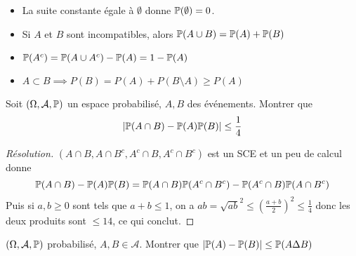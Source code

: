\begin{rem}
    \begin{itemize}
        \item La suite constante égale à $\emptyset$ donne $\P(\emptyset)=0$.
        \item Si $A$ et $B$ sont incompatibles, alors $\P(A\cup B)=\P(A)+\P(B)$ 
        \item $\P(A^c)=\P(A\cup A^c)-\P(A)=1-\P(A)$
        \item $A\subset B \implies P(B)=P(A)+P(B\setminus A)\geq P(A)$
    \end{itemize}
\end{rem}

\begin{exo}
    Soit $(\Omega, \mathcal A, \P)$ un espace probabilisé, $A, B$ des événements. Montrer que \[
        |\P(A\cap B)-\P(A)\P(B)|\leq \frac{1}{4}
    \]
\end{exo}

\begin{proof}[Résolution]
    $(A\cap B, A\cap B^c, A^c\cap B, A^c\cap B^c)$ est un SCE et un peu de calcul donne \[
        \P(A\cap B)-\P(A)\P(B)=\P(A\cap B)\P(A^c\cap B^c)-\P(A^c\cap B)\P(A\cap B^c)
    \]
    Puis si $a,b\geq 0$ sont tels que $a+b\leq 1$, on a $ab=\sqrt{ab}^2\leq \left( \frac{a+b}{2} \right) ^2\leq \frac{1}{4}$ donc les deux produits sont $\leq 14$, ce qui conclut.
\end{proof}

\begin{exo}
    $(\Omega, \mathcal A, \P)$ probabilisé, $A, B \in \mathcal A$. Montrer que $|\P(A)-\P(B)| \leq \P(A\Delta B)$
\end{exo}
